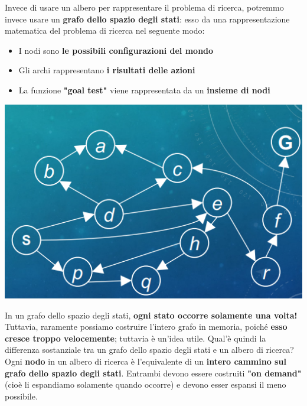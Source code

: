 \documentclass[12pt]{article}
\begin{document}
Invece di usare un albero per rappresentare il problema di ricerca, potremmo invece usare un \textbf{grafo dello spazio degli stati}: esso da una rappresentazione matematica del problema di ricerca nel seguente modo:
\begin{itemize}
    \item I nodi sono \textbf{le possibili configurazioni del mondo}
    \item Gli archi rappresentano \textbf{i risultati delle azioni}
    \item La funzione \textbf{"goal test"} viene rappresentata da un \textbf{insieme di nodi}
\end{itemize}
\begin{center}
    \includegraphics[width = 0.50\linewidth]{Images/15.PNG}
\end{center}
In un grafo dello spazio degli stati, \textbf{ogni stato occorre solamente una volta!} Tuttavia, raramente possiamo costruire l'intero grafo in memoria, poiché \textbf{esso cresce troppo velocemente}; tuttavia è un'idea utile.
Qual'è quindi la differenza sostanziale tra un grafo dello spazio degli stati e un albero di ricerca? Ogni \textbf{nodo} in un albero di ricerca è l'equivalente di un \textbf{intero cammino sul grafo dello spazio degli stati}.
Entrambi devono essere costruiti \textbf{"on demand"} (cioè li espandiamo solamente quando occorre) e devono esser espansi il meno possibile.
\end{document}
